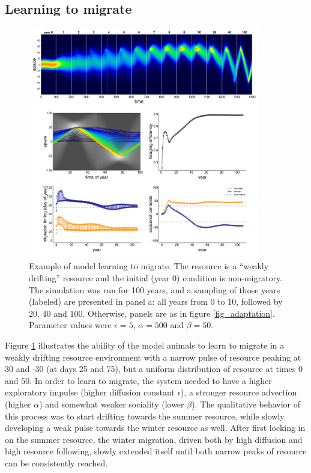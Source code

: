 \documentclass[12pt]{article}
\begin{document}
\subsection{Learning to migrate}

\begin{figure}
\includegraphics[width = 0.9\textwidth]{figures/example2_learningtomigrate.png} 

\caption{\label{fig_learningtomigrate} Example of model learning to migrate. The resource is a
``weakly drifting'' resource and the initial (year 0) condition is non-migratory. The simulation was run for 100 years, and a sampling of those years (labeled) are presented in panel a: all years from 0 to 10, followed by 20, 40 and 100. Otherwise, panels are as in figure \ref{fig_adaptation}. Parameter values were $\epsilon = 5$, $\alpha = 500$ and $\beta = 50$.}
\end{figure}


Figure \ref{fig_learningtomigrate} illustrates the ability of the model animals to learn to migrate in a weakly drifting resource environment with a narrow pulse of resource peaking at 30 and -30 (at days 25 and 75), but a uniform distribution of resource at times 0 and 50. In order to learn to migrate, the system needed to have a higher exploratory impulse (higher diffusion constant $\epsilon$), a stronger resource advection (higher $\alpha$) and somewhat weaker sociality (lower $\beta$). The qualitative behavior of this process was to start drifting towards the summer resource, while slowly developing a weak pulse towards the winter resource as well. After first locking in on the summer resource, the winter migration, driven both by high diffusion and high resource following, slowly extended itself until both narrow peaks of resource can be consistently reached.
\end{document}
